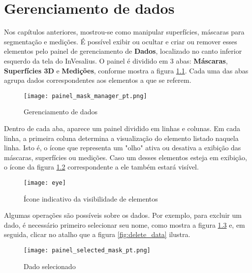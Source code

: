 \chapter{Gerenciamento de dados}

Nos capítulos anteriores, mostrou-se como manipular superfícies, máscaras para segmentação
e medições. É possível exibir ou ocultar e criar ou remover esses elementos pelo painel de
gerenciamento de \textbf{Dados}, localizado no canto inferior esquerdo da tela do InVesalius.
O painel é dividido em 3 abas: \textbf{Máscaras}, \textbf{Superfícies 3D} e \textbf{Medições},
conforme mostra a figura \ref{fig:volumetric_data}. Cada uma das abas agrupa dados
correspondentes aos elementos a que se referem.


\begin{figure}[!htb]
\centering
\texttt{[image: painel\_mask\_manager\_pt.png]}
\caption{Gerenciamento de dados}
\label{fig:volumetric_data}
\end{figure}

Dentro de cada aba, aparece um painel dividido em linhas e colunas. Em cada linha, a primeira
coluna determina a visualização do elemento listado naquela linha. Isto é, o ícone que
representa um "olho" ativa ou desativa a exibição das máscaras, superfícies ou medições. Caso
um desses elementos esteja em exibição, o ícone da figura \ref{fig:disable_mask} correspondente
a ele também estará visível.

\newpage

\begin{figure}[!htb]
\centering
\texttt{[image: eye]}
\caption{Ícone indicativo da visibilidade de elementos}
\label{fig:disable_mask}
\end{figure}

Algumas operações são possíveis sobre os dados. Por exemplo, para excluir um dado, é necessário
primeiro selecionar seu nome, como mostra a figura \ref{fig:selected_mask} e, em seguida, clicar
no atalho que a figura \ref{fig:delete_data} ilustra.

\begin{figure}[!htb]
\centering
\texttt{[image: painel\_selected\_mask\_pt.png]}
\caption{Dado selecionado}
\label{fig:selected_mask}
\end{figure}


